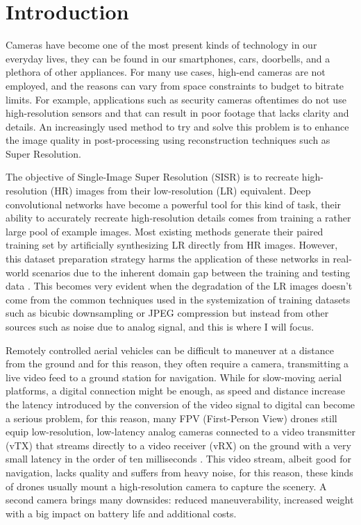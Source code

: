 \newpage
\chapter{Introduction}
\label{cha:introduction}

Cameras have become one of the most present kinds of technology in our everyday lives, they can be found in our smartphones, cars, doorbells, and a plethora of other appliances. For many use cases, high-end cameras are not employed, and the reasons can vary from space constraints to budget to bitrate limits. For example, applications such as security cameras oftentimes do not use high-resolution sensors and that can result in poor footage that lacks clarity and details. An increasingly used method to try and solve this problem is to enhance the image quality in post-processing using reconstruction techniques such as Super Resolution.

The objective of Single-Image Super Resolution (SISR) is to recreate high-resolution (HR) images from their low-resolution (LR) equivalent.
Deep convolutional networks have become a powerful tool for this kind of task, their ability to accurately recreate high-resolution details comes from training a rather large pool of example images.
Most existing methods generate their paired training set by artificially synthesizing LR directly from HR images. However, this dataset preparation strategy harms the application of these networks in real-world scenarios due to the inherent domain gap between the training and testing data \cite{9711325}.
This becomes very evident when the degradation of the LR images doesn't come from the common techniques used in the systemization of training datasets such as bicubic downsampling or JPEG compression but instead from other sources such as noise due to analog signal, and this is where I will focus.

Remotely controlled aerial vehicles can be difficult to maneuver at a distance from the ground and for this reason, they often require a camera, transmitting a live video feed to a ground station for navigation. While for slow-moving aerial platforms, a digital connection might be enough, as speed and distance increase the latency introduced by the conversion of the video signal to digital can become a serious problem, for this reason, many FPV (First-Person View) drones still equip low-resolution, low-latency analog cameras connected to a video transmitter (vTX) that streams directly to a video receiver (vRX) on the ground with a very small latency in the order of ten milliseconds \cite{oscar}. This video stream, albeit good for navigation, lacks quality and suffers from heavy noise, for this reason, these kinds of drones usually mount a high-resolution camera to capture the scenery. A second camera brings many downsides: reduced maneuverability, increased weight with a big impact on battery life and additional costs.

